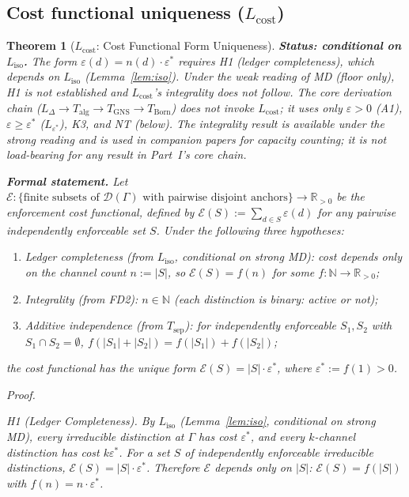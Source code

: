 \documentclass[11pt,a4paper]{article}
\newtheorem{theorem}{Theorem}[section]
\theoremstyle{definition}
\newcommand{\eps}{\varepsilon}
\begin{document}
\subsection{Cost functional uniqueness ($L_{\mathrm{cost}}$)}

\begin{theorem}[$L_{\mathrm{cost}}$: Cost Functional Form Uniqueness]\label{thm:Lcost}
\textbf{Status: conditional on $L_{\mathrm{iso}}$.}  The form $\eps(d) = n(d) \cdot \eps^*$ requires H1 (ledger completeness), which depends on $L_{\mathrm{iso}}$ (Lemma~\ref{lem:iso}).  Under the weak reading of MD (floor only), H1 is not established and $L_{\mathrm{cost}}$'s integrality does not follow.  The core derivation chain ($L_\Delta \to T_{\mathrm{alg}} \to T_{\mathrm{GNS}} \to T_{\mathrm{Born}}$) does not invoke $L_{\mathrm{cost}}$; it uses only $\eps > 0$ (A1), $\eps \ge \eps^*$ ($L_{\eps^*}$), K3, and NT (below).  The integrality result is available under the strong reading and is used in companion papers for capacity counting; it is not load-bearing for any result in Part~I's core chain.

\smallskip\noindent\textbf{Formal statement.}  Let $\mathcal{E}: \{\text{finite subsets of } \mathcal{D}(\Gamma) \text{ with pairwise disjoint anchors}\} \to \mathbb{R}_{>0}$ be the enforcement cost functional, defined by $\mathcal{E}(S) := \sum_{d \in S} \eps(d)$ for any pairwise independently enforceable set $S$.  Under the following three hypotheses:
\begin{enumerate}[nosep,label=(H\arabic*),leftmargin=3em]
\item \textit{Ledger completeness} (from $L_{\mathrm{iso}}$, conditional on strong MD): cost depends only on the channel count $n := |S|$, so $\mathcal{E}(S) = f(n)$ for some $f: \mathbb{N} \to \mathbb{R}_{>0}$;
\item \textit{Integrality} (from FD2): $n \in \mathbb{N}$ (each distinction is binary: active or not);
\item \textit{Additive independence} (from $T_{\mathrm{sep}}$): for independently enforceable $S_1, S_2$ with $S_1 \cap S_2 = \emptyset$, $f(|S_1| + |S_2|) = f(|S_1|) + f(|S_2|)$;
\end{enumerate}
the cost functional has the unique form $\mathcal{E}(S) = |S| \cdot \eps^*$, where $\eps^* := f(1) > 0$.

\smallskip\noindent\textit{Proof.}

\textit{H1 (Ledger Completeness).}  By $L_{\mathrm{iso}}$ (Lemma~\ref{lem:iso}, conditional on strong MD), every irreducible distinction at $\Gamma$ has cost $\eps^*$, and every $k$-channel distinction has cost $k\eps^*$.  For a set $S$ of independently enforceable irreducible distinctions, $\mathcal{E}(S) = |S| \cdot \eps^*$.  Therefore $\mathcal{E}$ depends only on $|S|$: $\mathcal{E}(S) = f(|S|)$ with $f(n) = n \cdot \eps^*$.


\end{theorem}
\end{document}
